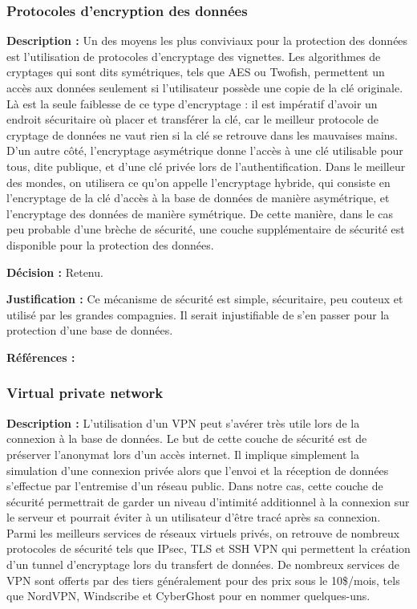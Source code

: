 \subsubsection{Protocoles d’encryption des données}

\textbf{Description :} Un des moyens les plus conviviaux pour la protection des données est l’utilisation de protocoles d’encryptage des vignettes. Les algorithmes de cryptages qui sont dits symétriques, tels que AES ou Twofish, permettent un accès aux données seulement si l’utilisateur possède une copie de la clé originale. Là est la seule faiblesse de ce type d’encryptage : il est impératif d’avoir un endroit sécuritaire où placer et transférer la clé, car le meilleur protocole de cryptage de données ne vaut rien si la clé se retrouve dans les mauvaises mains. D’un autre côté, l’encryptage asymétrique donne l’accès à une clé utilisable pour tous, dite publique, et d’une clé privée lors de l’authentification. Dans le meilleur des mondes, on utilisera ce qu’on appelle l’encryptage hybride, qui consiste en l’encryptage de la clé d’accès à la base de données de manière asymétrique, et l’encryptage des données de manière symétrique. De cette manière, dans le cas peu probable d’une brèche de sécurité, une couche supplémentaire de sécurité est disponible pour la protection des données.

\textbf{Décision :} Retenu.

\textbf{Justification :}  Ce mécanisme de sécurité est simple, sécuritaire, peu couteux et utilisé par les grandes compagnies. Il serait injustifiable de s’en passer pour la protection d’une base de données.

\textbf{Références :} \cite{encryptage hybride}

\subsubsection{Virtual private network}

\textbf{Description :} L’utilisation d’un VPN peut s’avérer très utile lors de la connexion à la base de données. Le but de cette couche de sécurité est de préserver l’anonymat lors d’un accès internet. Il implique simplement la simulation d’une connexion privée alors que l’envoi et la réception de données s’effectue par l’entremise d’un réseau public. Dans notre cas, cette couche de sécurité permettrait de garder un niveau d’intimité additionnel à la connexion sur le serveur et pourrait éviter à un utilisateur d’être tracé après sa connexion. Parmi les meilleurs services de réseaux virtuels privés, on retrouve de nombreux protocoles de sécurité tels que IPsec, TLS et SSH VPN qui permettent la création d’un tunnel d’encryptage lors du transfert de données. De nombreux services de VPN sont offerts par des tiers généralement pour des prix sous le 10\$/mois, tels que NordVPN, Windscribe et CyberGhost pour en nommer quelques-uns.

